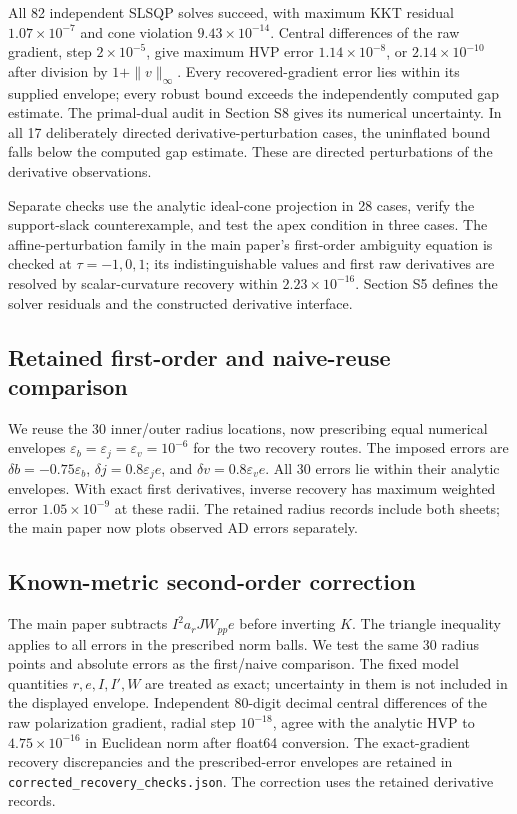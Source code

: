 All 82 independent SLSQP solves succeed, with maximum KKT residual $1.07\times10^{-7}$ and cone violation $9.43\times10^{-14}$. Central differences of the raw gradient, step $2\times10^{-5}$, give maximum HVP error $1.14\times10^{-8}$, or $2.14\times10^{-10}$ after division by $1+\|v\|_\infty$. Every recovered-gradient error lies within its supplied envelope; every robust bound exceeds the independently computed gap estimate. The primal-dual audit in Section S8 gives its numerical uncertainty. In all 17 deliberately directed derivative-perturbation cases, the uninflated bound falls below the computed gap estimate. These are directed perturbations of the derivative observations.

Separate checks use the analytic ideal-cone projection in 28 cases, verify the support-slack counterexample, and test the apex condition in three cases. The affine-perturbation family in the main paper's first-order ambiguity equation is checked at $\tau=-1,0,1$; its indistinguishable values and first raw derivatives are resolved by scalar-curvature recovery within $2.23\times10^{-16}$. Section S5 defines the solver residuals and the constructed derivative interface.



\subsection{Retained first-order and naive-reuse comparison}
We reuse the 30 inner/outer radius locations, now prescribing equal numerical envelopes $\varepsilon_b=\varepsilon_j=\varepsilon_v=10^{-6}$ for the two recovery routes. The imposed errors are $\delta b=-0.75\varepsilon_b$, $\delta j=0.8\varepsilon_je$, and $\delta v=0.8\varepsilon_ve$. All 30 errors lie within their analytic envelopes. With exact first derivatives, inverse recovery has maximum weighted error $1.05\times10^{-9}$ at these radii. The retained radius records include both sheets; the main paper now plots observed AD errors separately.



\subsection{Known-metric second-order correction}
The main paper subtracts $I^2a_rJW_{pp}e$ before inverting $K$. The triangle inequality applies to all errors in the prescribed norm balls. We test the same 30 radius points and absolute errors as the first/naive comparison. The fixed model quantities $r,e,I,I',W$ are treated as exact; uncertainty in them is not included in the displayed envelope. Independent 80-digit decimal central differences of the raw polarization gradient, radial step $10^{-18}$, agree with the analytic HVP to $4.75\times10^{-16}$ in Euclidean norm after float64 conversion. The exact-gradient recovery discrepancies and the prescribed-error envelopes are retained in \nolinkurl{corrected_recovery_checks.json}. The correction uses the retained derivative records.

